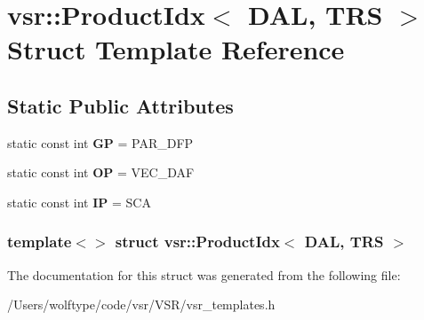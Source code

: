 \hypertarget{structvsr_1_1_product_idx_3_01_d_a_l_00_01_t_r_s_01_4}{\section{vsr\-:\-:Product\-Idx$<$ D\-A\-L, T\-R\-S $>$ Struct Template Reference}
\label{structvsr_1_1_product_idx_3_01_d_a_l_00_01_t_r_s_01_4}
}
\subsection*{Static Public Attributes}
\begin{DoxyCompactItemize}
\item 
\hypertarget{structvsr_1_1_product_idx_3_01_d_a_l_00_01_t_r_s_01_4_af796e762f7e6b5eab990278900a2fc89}{static const int {\bfseries G\-P} = P\-A\-R\-\_\-\-D\-F\-P}\label{structvsr_1_1_product_idx_3_01_d_a_l_00_01_t_r_s_01_4_af796e762f7e6b5eab990278900a2fc89}

\item 
\hypertarget{structvsr_1_1_product_idx_3_01_d_a_l_00_01_t_r_s_01_4_a54f3425126f0ef6bb6b1db36e6070670}{static const int {\bfseries O\-P} = V\-E\-C\-\_\-\-D\-A\-F}\label{structvsr_1_1_product_idx_3_01_d_a_l_00_01_t_r_s_01_4_a54f3425126f0ef6bb6b1db36e6070670}

\item 
\hypertarget{structvsr_1_1_product_idx_3_01_d_a_l_00_01_t_r_s_01_4_aabd3e51652ea8ec22986762f7ee87260}{static const int {\bfseries I\-P} = S\-C\-A}\label{structvsr_1_1_product_idx_3_01_d_a_l_00_01_t_r_s_01_4_aabd3e51652ea8ec22986762f7ee87260}

\end{DoxyCompactItemize}
\subsubsection*{template$<$$>$ struct vsr\-::\-Product\-Idx$<$ D\-A\-L, T\-R\-S $>$}



The documentation for this struct was generated from the following file\-:\begin{DoxyCompactItemize}
\item 
/\-Users/wolftype/code/vsr/\-V\-S\-R/vsr\-\_\-templates.\-h\end{DoxyCompactItemize}
